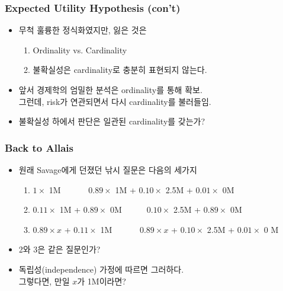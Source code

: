 \documentclass[final]{beamer}
\begin{document}
\begin{frame}\frametitle{Expected Utility Hypothesis (con't)}\vspace{3.5em}
\begin{itemize}
\item 무척 훌륭한 정식화였지만, 잃은 것은 
	\begin{enumerate}
		\item Ordinality vs. Cardinality 
		\item 불확실성은 cardinality로 충분히 표현되지 않는다. 
	\end{enumerate}
\item 앞서 경제학의 엄밀한 분석은 ordinality를 통해 확보. \\ 그런데, risk가 연관되면서 다시 cardinality를 불러들임. 
\item 불확실성 하에서 판단은 일관된 cardinality를 갖는가?  
\end{itemize}
\end{frame}
%
\begin{frame}\frametitle{Back to Allais}\vspace{3em}
\begin{itemize}
	\item 원래 Savage에게 던졌던 낚시 질문은 다음의 세가지 
	\begin{enumerate}
	\item  $1 \times$ 1M~~~{\color{red}{vs.}}~~~ $0.89 \times$ 1M + $0.10 \times$ 2.5M + $0.01 \times$ 0M 
	\item  $0.11 \times$ 1M + $0.89 \times$ 0M~~~{\color{red}{vs.}}~~~$0.10 \times$ 2.5M + $0.89 \times$ 0M
	\item  $0.89 \times x$ + $0.11 \times$ 1M~~~{\color{red}{vs.}}~~~
	$0.89 \times x$ + $0.10 \times$ 2.5M + $0.01 \times$ 0	M
	\end{enumerate}
	\item 2와 3은 같은 질문인가?
	\item 독립성(independence) 가정에 따르면 그러하다. \\그렇다면, 만일 $x$가 1M이라면?   
\end{itemize}
\end{frame}
%
\end{document}
